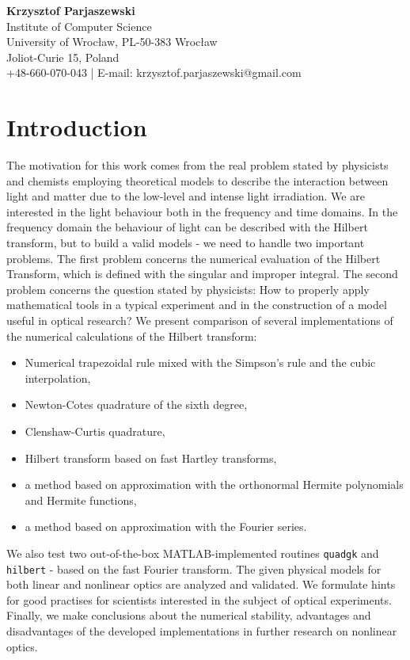 \documentclass[12pt,twoside,a4paper]{article}
\numberwithin{equation}{subsection}
\numberwithin{figure}{subsection}
\begin{document}
\textbf{Krzysztof Parjaszewski} \\
Institute of Computer Science \\
University of Wrocław, PL-50-383 Wrocław \\
Joliot-Curie 15, Poland \\
+48-660-070-043 | E-mail: krzysztof.parjaszewski@gmail.com

\section{Introduction} \label{chap:introduction}

The motivation for this work comes from the real problem stated by physicists and chemists employing theoretical models to describe the interaction between light and matter due to the low-level and intense light irradiation. We are interested in the light behaviour both in the frequency and time domains. In the frequency domain the behaviour of light can be described with the Hilbert transform, but to build a valid models - we need to handle two important problems. The first problem concerns the numerical evaluation of the Hilbert Transform, which is defined with the singular and improper integral. The second problem concerns the question stated by physicists: How to properly apply mathematical tools in a typical experiment and in the construction of a model useful in optical research? We present comparison of several implementations of the numerical calculations of the Hilbert transform:

\begin{itemize} \label{used_methods}
 \item Numerical trapezoidal rule mixed with the Simpson's rule and the cubic interpolation,
 \item Newton-Cotes quadrature of the sixth degree,
 \item Clenshaw-Curtis quadrature,
 \item Hilbert transform based on fast Hartley transforms,
 \item a method based on approximation with the orthonormal Hermite polynomials and Hermite functions,
 \item a method based on approximation with the Fourier series.
\end{itemize}

We also test two out-of-the-box MATLAB-implemented routines \texttt{quadgk} and \texttt{hil\-bert} - based on the fast Fourier transform. The given physical models for both linear and nonlinear optics are analyzed and validated. We formulate hints for good practises for scientists interested in the subject of optical experiments. Finally, we make conclusions about the numerical stability, advantages and disadvantages of the developed implementations in further research on nonlinear optics.
\end{document}
